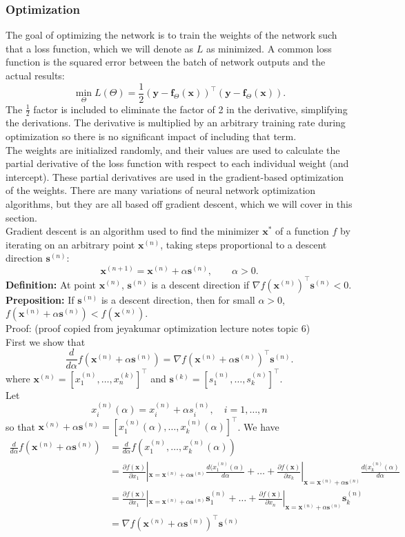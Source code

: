 \documentclass[a4paper,12pt]{article}
\numberwithin{equation}{section}
\begin{document}
\subsubsection{Optimization}
The goal of optimizing the network is to train the weights of the network such that a loss function, which we will denote as $L$ as minimized. A common loss function is the squared error between the batch of network outputs and the actual results:
\[\min_\Theta L(\Theta)=\frac12 (\bm{y}-\bm{f}_\Theta(\bm{x}))^\top(\bm{y}-\bm{f}_\Theta(\bm{x})).\]
The $\frac12$ factor is included to eliminate the factor of 2 in the derivative, simplifying the derivations. The derivative is multiplied by an arbitrary training rate during optimization so there is no significant impact of including that term.\\
The weights are initialized randomly, and their values are used to calculate the partial derivative of the loss function with respect to each individual weight (and intercept). These partial derivatives are used in the gradient-based optimization of the weights. There are many variations of neural network optimization algorithms, but they are all based off gradient descent, which we will cover in this section.\\
Gradient descent is an algorithm used to find the minimizer $\bm{x}^*$ of a function $f$ by iterating on an arbitrary point $\bm{x}^{(n)}$, taking steps proportional to a descent direction $\bm{s}^{(n)}$:
\[\bm{x}^{(n+1)}=\bm{x}^{(n)}+\alpha \bm{s}^{(n)},\qquad \alpha>0.\] 
\textbf{Definition:} At point $\bm{x}^{(n)}$, $\bm{s}^{(n)}$ is a descent direction if $\nabla f(\bm{x}^{(n)})^\top \bm{s}^{(n)}<0$.\\
\textbf{Preposition:} If $\bm{s}^{(n)}$ is a descent direction, then for small $\alpha>0$, $f(\bm{x}^{(n)}+\alpha \bm{s}^{(n)})<f(\bm{x}^{(n)})$.\\
Proof: (proof copied from jeyakumar optimization lecture notes topic 6)\\
First we show that
\[\frac{d}{d\alpha}f(\bm{x}^{(n)}+\alpha \bm{s}^{(n)})=\nabla f(\bm{x}^{(n)}+\alpha \bm{s}^{(n)})^\top \bm{s}^{(n)}.\]
where $\bm{x}^{(n)}=[x_1^{(n)},\dots,x_n^{(k)}]^\top$ and $\bm{s}^{(k)}=[s_1^{(n)},\dots,s_k^{(n)}]^\top$.\\
Let
\[x_i^{(n)}(\alpha)=x_i^{(n)}+\alpha s_i^{(n)},\quad i=1,\dots,n\]
so that $\bm{x}^{(n)}+\alpha \bm{s}^{(n)}=[x_1^{(n)}(\alpha),\dots,x_k^{(n)}(\alpha)]^\top$.
We have
\begin{align*}
\frac{d}{d\alpha}f(\bm{x}^{(n)}+\alpha\bm{s}^{(n)})&= \frac{d}{d\alpha}f(x_1^{(n)},\dots,x_k^{(n)}(\alpha))\\
&= \frac{\partial f(\bm{x})}{\partial x_1}|_{\bm{x}=\bm{x}^{(n)}+\alpha \bm{s}^{(n)}}\frac{d(x_1^{(n)}(\alpha)}{d\alpha}+\dots+\frac{\partial f(\bm{x})}{\partial x_k}|_{\bm{x}=\bm{x}^{(n)}+\alpha \bm{s}^{(n)}}\frac{d(x_k^{(n)}(\alpha)}{d\alpha}\\
&=\frac{\partial f(\bm{x})}{\partial x_1}|_{\bm{x}=\bm{x}^{(n)}+\alpha \bm{s}^{(n)}}\bm{s}_1^{(n)}+\dots+\frac{\partial f(\bm{x})}{\partial x_n}|_{\bm{x}=\bm{x}^{(n)}+\alpha \bm{s}^{(n)}}\bm{s}_k^{(n)}\\
&=\nabla f(\bm{x}^{(n)}+\alpha \bm{s}^{(n)})^\top \bm{s}^{(n)}
\end{align*}
\end{document}
